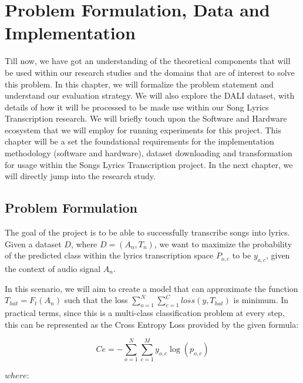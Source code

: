 \chapter{Problem Formulation, Data and Implementation}%
\label{sec:problemdataimplementation}

Till now, we have got an understanding of the theoretical components that will be used within our research studies and the domains that are of interest to solve this problem. In this chapter, we will formalize the problem statement and understand our evaluation strategy. We will also explore the DALI dataset, with details of how it will be processed to be made use within our Song Lyrics Transcription research. We will briefly touch upon the Software and Hardware ecosystem that we will employ for running experiments for this project. This chapter will be a set the foundational requirements for the implementation methodology (software and hardware), dataset downloading and transformation for usage within the Songs Lyrics Transcription project. In the next chapter, we will directly jump into the research study.


\section{Problem Formulation}%
\label{sec:problemformulation}

The goal of the project is to be able to successfully transcribe songs into lyrics. Given a dataset $D$, where $D = (A_n,T_n)$,  we want to maximize the probability of the predicted class within the lyrics transcription space $P_{o,c}$ to be $y_{o,c}$, given the context of audio signal $A_n$.

In this scenario, we will aim to create a model that can approximate the function $T_{hat} = F_t(A_n)$ such that the loss  $\sum_{o=1}^N \sum_{c=1}^C loss(y, T_{hat})$ is minimum. In practical terms, since this is a multi-class classification problem at every step, this can be represented as the Cross Entropy Loss provided by the given formula:

\begin{equation}
 {C{e}} = -\sum_{o=1}^N \sum_{c=1}^My_{o,c}\log(p_{o,c})
\end{equation}

$where : $

